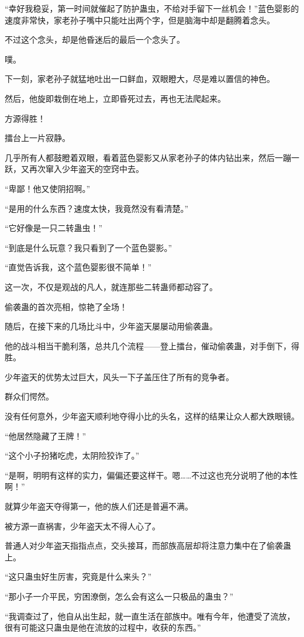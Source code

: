 \begin{this_body}
“幸好我稳妥，第一时间就催起了防护蛊虫，不给对手留下一丝机会！”蓝色婴影的速度非常快，家老孙子嘴中只能吐出两个字，但是脑海中却是翻腾着念头。

不过这个念头，却是他昏迷后的最后一个念头了。

噗。

下一刻，家老孙子就猛地吐出一口鲜血，双眼瞪大，尽是难以置信的神色。

然后，他旋即栽倒在地上，立即昏死过去，再也无法爬起来。

方源得胜！

擂台上一片寂静。

几乎所有人都鼓瞪着双眼，看着蓝色婴影又从家老孙子的体内钻出来，然后一蹦一跃，又再次窜入少年盗天的空窍中去。

“卑鄙！他又使阴招啊。”

“是用的什么东西？速度太快，我竟然没有看清楚。”

“它好像是一只二转蛊虫！”

“到底是什么玩意？我只看到了一个蓝色婴影。”

“直觉告诉我，这个蓝色婴影很不简单！”

这一次，不仅是观战的凡人，就连那些二转蛊师都动容了。

偷袭蛊的首次亮相，惊艳了全场！

随后，在接下来的几场比斗中，少年盗天屡屡动用偷袭蛊。

他的战斗相当干脆利落，总共几个流程——登上擂台，催动偷袭蛊，对手倒下，得胜。

少年盗天的优势太过巨大，风头一下子盖压住了所有的竞争者。

群众们愕然。

没有任何意外，少年盗天顺利地夺得小比的头名，这样的结果让众人都大跌眼镜。

“他居然隐藏了王牌！”

“这个小子扮猪吃虎，太阴险狡诈了。”

“是啊，明明有这样的实力，偏偏还要这样干。嗯……不过这也充分说明了他的本性啊！”

就算少年盗天夺得第一，他的族人们还是普遍不满。

被方源一直祸害，少年盗天太不得人心了。

普通人对少年盗天指指点点，交头接耳，而部族高层却将注意力集中在了偷袭蛊上。

“这只蛊虫好生厉害，究竟是什么来头？”

“那小子一介平民，穷困潦倒，怎么会有这么一只极品的蛊虫？”

“我调查过了，他自从出生起，就一直生活在部族中。唯有今年，他遭受了流放，很有可能这只蛊虫是他在流放的过程中，收获的东西。”


\end{this_body}
